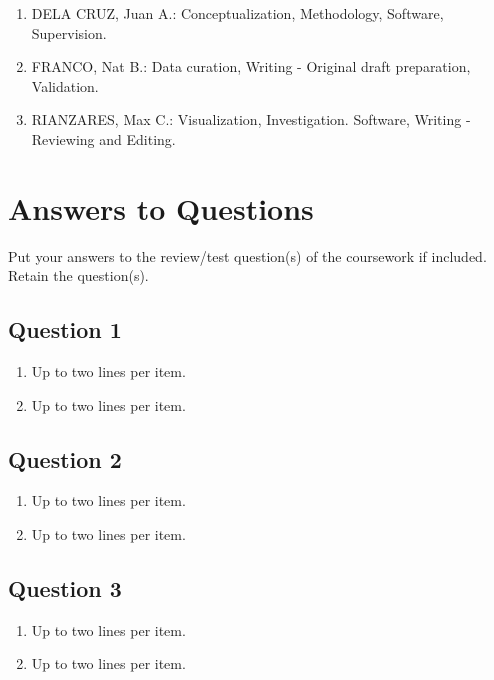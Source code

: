 \begin{enumerate}
	\item DELA CRUZ, Juan A.: Conceptualization, Methodology, Software, Supervision.
	
	\item FRANCO, Nat B.: Data curation, Writing - Original draft preparation, Validation.
	
	\item RIANZARES, Max C.: Visualization, Investigation. Software, Writing - Reviewing and Editing.
\end{enumerate}














\section{Answers to Questions}
\label{sec:ans2ques}

Put your answers to the review/test question(s) of the coursework if included.  Retain the question(s). 

\subsection{Question 1}  
\begin{enumerate}
\item Up to two lines per item.
\item Up to two lines per item.
\end{enumerate}	
	
\subsection{Question 2}  
\begin{enumerate}
\item Up to two lines per item.
\item Up to two lines per item.
\end{enumerate}
	
\subsection{Question 3}  
\begin{enumerate}
\item Up to two lines per item.
\item Up to two lines per item.
\end{enumerate}	







